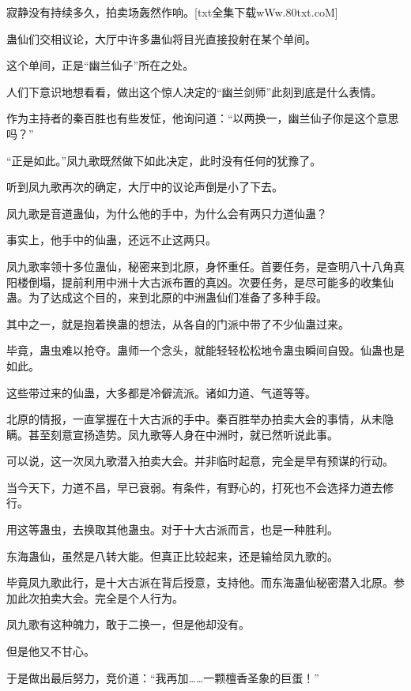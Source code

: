 
\begin{this_body}

寂静没有持续多久，拍卖场轰然作响。[txt全集下载wWw.80txt.coM]

蛊仙们交相议论，大厅中许多蛊仙将目光直接投射在某个单间。

这个单间，正是“幽兰仙子”所在之处。

人们下意识地想看看，做出这个惊人决定的“幽兰剑师”此刻到底是什么表情。

作为主持者的秦百胜也有些发怔，他询问道：“以两换一，幽兰仙子你是这个意思吗？”

“正是如此。”凤九歌既然做下如此决定，此时没有任何的犹豫了。

听到凤九歌再次的确定，大厅中的议论声倒是小了下去。

凤九歌是音道蛊仙，为什么他的手中，为什么会有两只力道仙蛊？

事实上，他手中的仙蛊，还远不止这两只。

凤九歌率领十多位蛊仙，秘密来到北原，身怀重任。首要任务，是查明八十八角真阳楼倒塌，提前利用中洲十大古派布置的真凶。次要任务，是尽可能多的收集仙蛊。为了达成这个目的，来到北原的中洲蛊仙们准备了多种手段。

其中之一，就是抱着换蛊的想法，从各自的门派中带了不少仙蛊过来。

毕竟，蛊虫难以抢夺。蛊师一个念头，就能轻轻松松地令蛊虫瞬间自毁。仙蛊也是如此。

这些带过来的仙蛊，大多都是冷僻流派。诸如力道、气道等等。

北原的情报，一直掌握在十大古派的手中。秦百胜举办拍卖大会的事情，从未隐瞒。甚至刻意宣扬造势。凤九歌等人身在中洲时，就已然听说此事。

可以说，这一次凤九歌潜入拍卖大会。并非临时起意，完全是早有预谋的行动。

当今天下，力道不昌，早已衰弱。有条件，有野心的，打死也不会选择力道去修行。

用这等蛊虫，去换取其他蛊虫。对于十大古派而言，也是一种胜利。

东海蛊仙，虽然是八转大能。但真正比较起来，还是输给凤九歌的。

毕竟凤九歌此行，是十大古派在背后授意，支持他。而东海蛊仙秘密潜入北原。参加此次拍卖大会。完全是个人行为。

凤九歌有这种魄力，敢于二换一，但是他却没有。

但是他又不甘心。

于是做出最后努力，竞价道：“我再加……一颗檀香圣象的巨蛋！”


\end{this_body}
